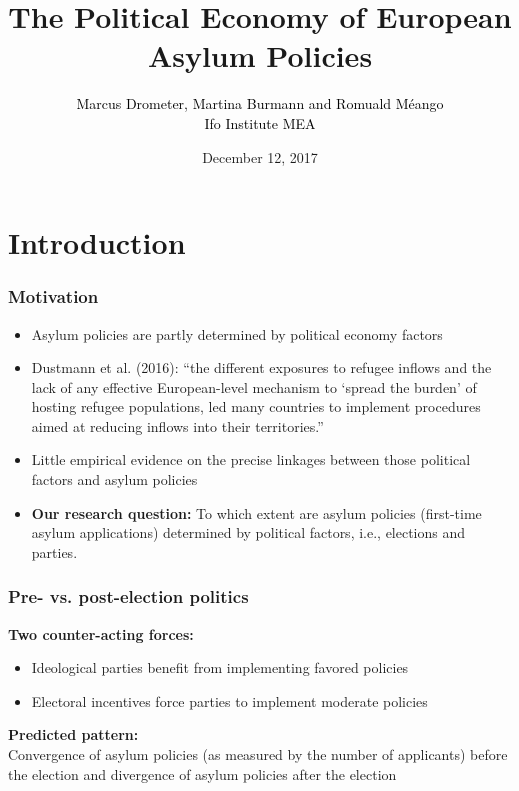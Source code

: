 \documentclass[compress, xcolor = {table,xcdraw}]{beamer}
\title {The Political Economy of European Asylum Policies}
\subtitle{\small\textcolor{black}{Marcus Drometer, Martina Burmann and Romuald M\'eango\\[1ex]
		\scriptsize{\hspace{10ex}Ifo Institute \hspace{29ex} MEA}}}
\institute{ifo Christmas Conference}
\date{December 12, 2017}
\begin{document}

\begin{frame}[plain]
\setlength{\leftmargin}{1cm}
\titlepage 
\end{frame}

\section{Introduction}

\begin{frame}
\frametitle{Motivation}
\begin{itemize}
	\item Asylum policies are partly determined by political economy
	factors
	
	\item Dustmann et al. (2016): ``the  different  exposures  to  refugee  inflows and  the  lack  of  any  effective  European-level  mechanism  to  `spread  the  burden'  of  hosting  refugee  populations,  led  many  countries  to  implement  procedures  aimed  at  reducing  inflows  into  their  territories.''
	
	\bigskip
	\item Little empirical evidence on the precise linkages between those political factors and asylum policies

	\bigskip
	\item \textbf{Our research question:} To which extent are asylum policies (first-time asylum applications) determined by political factors, i.e.,  elections and parties.
  
\end{itemize}
\end{frame}


\begin{frame} [t]
\frametitle{Pre- vs. post-election politics}
\textbf{Two counter-acting forces:}

\begin{itemize}
	\item Ideological parties benefit from implementing favored policies
	\item Electoral incentives force parties to implement moderate policies
\end{itemize}

\bigskip

\textbf{Predicted pattern:} \\
\smallskip
Convergence of asylum policies (as measured by the number of applicants) before the election and divergence of asylum policies after the election
\end{frame}
\end{document}
